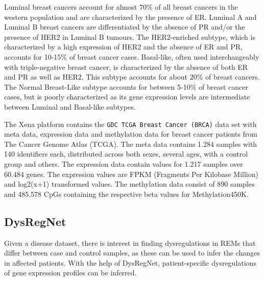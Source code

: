 \documentclass[pdftex,12pt,a4paper]{report}
\begin{document}
Luminal breast cancers account for almost 70\% of all breast cancers in the western population and are characterized by the presence of ER. Luminal A and Luminal B breast cancers are differentiated by the absence of PR and/or the presence of HER2 in Luminal B tumours. The HER2-enriched subtype, which is characterized by a high expression of HER2 and the absence of ER and PR, accounts for 10-15\% of breast cancer cases. Basal-like, often used interchangeably with triple-negative breast cancer, is characterized by the absence of both ER and PR as well as HER2\cite{brca_general}. This subtype accounts for about 20\% of breast cancers. The Normal Breast-Like subtype accounts for between 5-10\% of breast cancer cases, but is poorly characterized as its gene expression levels are intermediate between Luminal and Basal-like subtypes\cite{brca_normal_like}.

The Xena platform\cite{xena} contains the \texttt{GDC TCGA Breast Cancer (BRCA)} data set with meta data, expression data and methylation data for breast cancer patients from The Cancer Genome Atlas (TCGA)\cite{tcga}. The meta data contains 1.284 samples with 140 identifiers each, distributed across both sexes, several ages, with a control group and others. The expression data contain values for 1.217 samples over 60.484 genes. The expression values are FPKM (Fragments Per Kilobase Million) and log2(x+1) transformed values. The methylation data consist of 890 samples and 485.578 CpGs containing the respective beta values for Methylation450K\cite{methylation450}. 

\subsection{DysRegNet}
Given a disease dataset, there is interest in finding dysregulations in REMs that differ between case and control samples, as these can be used to infer the changes in affected patients. With the help of DysRegNet, patient-specific dysregulations of gene expression profiles can be inferred.
\end{document}
